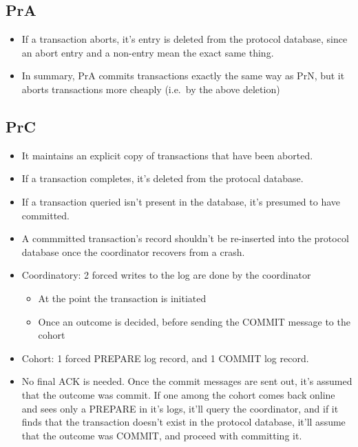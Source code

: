 \documentclass[a4paper]{article}
\begin{document}
\subsection{PrA}

\begin{itemize}
\item
    If a transaction aborts, it's entry is deleted from the protocol
    database, since an abort entry and a non-entry mean the exact same
    thing.
\item
    In summary, PrA commits transactions exactly the same way as PrN, but
    it aborts transactions more cheaply (i.e.~by the above deletion)
\end{itemize}

\subsection{PrC}

\begin{itemize}
\item
    It maintains an explicit copy of transactions that have been aborted.
\item
    If a transaction completes, it's deleted from the protocal database.
\item
    If a transaction queried isn't present in the database, it's presumed
    to have committed.
\item
    A commmitted transaction's record shouldn't be re-inserted into the
    protocol database once the coordinator recovers from a crash.
\item
    Coordinatory: 2 forced writes to the log are done by the coordinator

    \begin{itemize}
        \item
        At the point the transaction is initiated
    \item
        Once an outcome is decided, before sending the COMMIT message to the
        cohort
    \end{itemize}
\item
    Cohort: 1 forced PREPARE log record, and 1 COMMIT log record.
\item
    No final ACK is needed. Once the commit messages are sent out, it's
    assumed that the outcome was commit. If one among the cohort comes
    back online and sees only a PREPARE in it's logs, it'll query the
    coordinator, and if it finds that the transaction doesn't exist in the
    protocol database, it'll assume that the outcome was COMMIT, and
    proceed with committing it.
\end{itemize}
\end{document}
